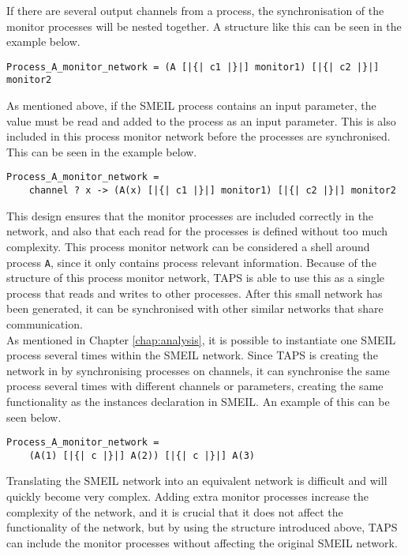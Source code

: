 If there are several output channels from a process, the synchronisation of the monitor processes will be nested together. A structure like this can be seen in the example below.
\begin{verbatim}
Process_A_monitor_network = (A [|{| c1 |}|] monitor1) [|{| c2 |}|] monitor2
\end{verbatim}
As mentioned above, if the SMEIL process contains an input parameter, the value must be read and added to the process as an input parameter. This is also included in this process monitor network before the processes are synchronised. This can be seen in the example below.
\begin{verbatim}
Process_A_monitor_network =
    channel ? x -> (A(x) [|{| c1 |}|] monitor1) [|{| c2 |}|] monitor2
\end{verbatim}
This design ensures that the monitor processes are included correctly in the network, and also that each read for the processes is defined without too much complexity. This process monitor network can be considered a shell around process \texttt{A}, since it only contains process relevant information. Because of the structure of this process monitor network, TAPS is able to use this as a single process that reads and writes to other processes. After this small network has been generated, it can be synchronised with other similar networks that share communication.\\

As mentioned in Chapter \ref{chap:analysis}, it is possible to instantiate one SMEIL process several times within the SMEIL network. Since TAPS is creating the network in \cspm{} by synchronising processes on channels, it can synchronise the same process several times with different channels or parameters, creating the same functionality as the instances declaration in SMEIL. An example of this can be seen below.\\ \begin{verbatim}
Process_A_monitor_network =
    (A(1) [|{| c |}|] A(2)) [|{| c |}|] A(3)
\end{verbatim}

Translating the SMEIL network into an equivalent \cspm{} network is difficult and will quickly become very complex. Adding extra monitor processes increase the complexity of the network, and it is crucial that it does not affect the functionality of the network, but by using the structure introduced above, TAPS can include the monitor processes without affecting the original SMEIL network.


